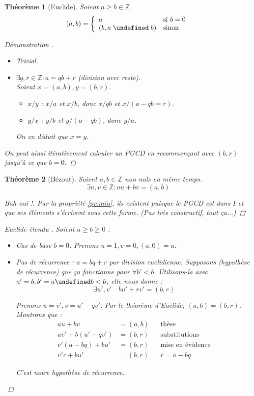 \documentclass[11pt,twocolumn]{article}
\let\mod\undefined
\DeclareMathOperator{\mod}{mod}
\theoremstyle{plain}
\newtheorem{thm}{Théorème}
\newcommand{\esZ}{\mathbb{Z}} %
\newenvironment{cproof}[1]{\begin{proof}[Démonstration \cite{#1}]}{\end{proof}}
\begin{document}
\begin{thm}[Euclide]
	Soient $a \geq b \in \esZ$. \[
		(a, b) = \left\{
			\begin{array}{ll}
				a & \text{si } b=0 \\
				(b, a \; \mod \; b) & \text{sinon} \\
			\end{array}
		\right.
	\]
	\begin{cproof}{Conlen} ~
		\begin{itemize}
			\item[$b=0$] Trivial.
			\item[$b\neq0$]
				$\exists q, r \in \esZ : a = qb+r$ (division avec reste). \\
				Soient $x=(a,b), y=(b,r)$.
				\begin{itemize}
					\item $x/y$ : $x/a$ et $x/b$, donc $x/qb$ et $x/(a-qb=r)$.
					\item $y/x$ : $y/b$ et $y/(a-qb)$, donc $y/a$.
				\end{itemize}
				On en déduit que $x=y$.
		\end{itemize}
		On peut ainsi itérativement calculer un PGCD en recommençant avec
		$(b,r)$ jusqu'à ce que $b=0$.
	\end{cproof}
\end{thm}
\begin{thm}[Bézout]
	Soient $a, b \in \esZ$ non nuls en même temps. \[
		\exists u, v \in \esZ : au+bv = (a, b)
	\]
	\begin{proof}[Bah oui !]
		Par la propriété \ref{pr:min}, ils existent puisque le PGCD est dans $I$
		et que ses éléments s'écrivent sous cette forme.
		\emph{(Pas très constructif, tout ça...)}
	\end{proof}
	\begin{proof}[Euclide étendu \cite{Gillis}]
		Soient $a \geq b \geq 0$ :
		\begin{itemize}
			\item Cas de base $b=0$. Prenons $u=1, v=0, (a,0)=a$.
			\item Pas de récurrence : $a=bq+r$ par division euclidienne.
				Supposons (hypothèse de récurrence) que
				ça fonctionne pour $\forall b'<b$.
				Utilisons-la avec $a'=b, b'=a\mod b<b$, elle nous donne : \[
					\exists u', v' \quad bu'+rv' = (b,r)
				\]

				Prenons $u=v', v=u'-qv'$.
				Par le théorème d'Euclide, $(a,b)=(b,r)$.
				Montrons que :
				\begin{align*}
					au+bv&=(a,b) && \text{thèse} \\
					av'+b\left(u'-qv'\right)&=(b,r) && \text{substitutions} \\
					v'\left(a-bq\right)+bu'&=(b,r) && \text{mise en évidence} \\
					v'r+bu'&=(b,r) && r=a-bq
				\end{align*}

				C'est notre hypothèse de récurrence.
		\end{itemize}
	\end{proof}
\end{thm}
\end{document}
